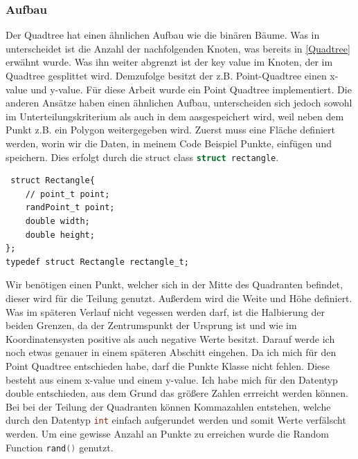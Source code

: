 \documentclass[11pt]{article}
\newcommand{\qt}{Quadtree }
\newcommand{\lstin}[1]{\lstinline[language=C]{#1}}
\begin{document}
\pagebreak

\subsubsection{Aufbau}

Der \qt hat einen ähnlichen Aufbau wie die binären Bäume. Was in unterscheidet ist die Anzahl der nachfolgenden Knoten, was bereits in \ref{Quadtree} erwähnt wurde.
Was ihn weiter abgrenzt ist der key value im Knoten, der im \qt gesplittet wird. Demzufolge besitzt der z.B. Point-\qt einen x-value und y-value. \newline
Für diese Arbeit wurde ein Point \qt implementiert. Die anderen Ansätze haben einen ähnlichen Aufbau, unterscheiden sich jedoch sowohl im Unterteilungskriterium als auch in dem aasgespeichert wird, weil neben dem Punkt z.B. ein Polygon weitergegeben wird.
\newline
Zuerst muss eine Fläche definiert werden, worin wir die Daten, in meinem Code Beispiel Punkte, einfügen und speichern. Dies erfolgt durch die struct class \lstin{struct rectangle}.
\begin{lstlisting}
 struct Rectangle{
    // point_t point; 
    randPoint_t point;                                                       
    double width;
    double height; 
};
typedef struct Rectangle rectangle_t;
\end{lstlisting}
Wir benötigen einen Punkt, welcher sich in der Mitte des Quadranten befindet, dieser wird für die Teilung genutzt. Außerdem wird die Weite und Höhe definiert. 
Was im späteren Verlauf nicht vegessen werden darf, ist die Halbierung der beiden Grenzen, da der Zentrumspunkt der Ursprung ist und wie im Koordinatensysten positive als auch negative Werte besitzt. 
Darauf werde ich noch etwas genauer in einem späteren Abschitt eingehen. 
\newline
Da ich mich für den Point \qt entschieden habe, darf die Punkte Klasse nicht fehlen. Diese besteht aus einem x-value und einem y-value. Ich habe mich für den Datentyp double entschieden, aus dem Grund das größere Zahlen errreicht werden können. Bei bei der Teilung der Quadranten können Kommazahlen entstehen, welche durch den Datentyp \lstin{int} einfach aufgerundet werden und somit Werte verfälscht werden. 
Um eine gewisse Anzahl an Punkte zu erreichen wurde die Random Function \lstin{rand()} genutzt.  
 
\end{document}
